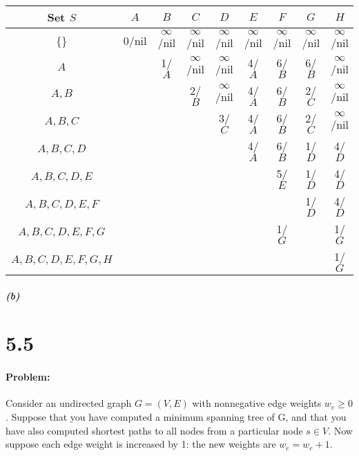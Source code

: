 \documentclass[12pt]{article}
\begin{document}
\begin{center}
\begin{tabular}{ | c | c | c | c | c | c | c | c | c |}
\hline
Set $S$ & $A$ & $B$ & $C$ & $D$ & $E$ & $F$ & $G$ & $H$ \\ \hline
\{\} & 0/nil & $\infty$/nil & $\infty$/nil & $\infty$/nil & $\infty$/nil
& $\infty$/nil & $\infty$/nil & $\infty$/nil \\ \hline
$A$ & & 1/$A$ & $\infty$/nil & $\infty$/nil & 4/$A$ & 6/$B$ & 6/$B$ & $\infty$/nil \\ \hline
$A,B$ & & & 2/$B$ & $\infty$/nil & 4/$A$ & 6/$B$ & 2/$C$ & $\infty$/nil \\ \hline
$A,B,C$ & & & & 3/$C$ & 4/$A$ & 6/$B$ & 2/$C$ & $\infty$/nil \\ \hline
$A,B,C,D$ & & & & & 4/$A$ & 6/$B$ & 1/$D$ & 4/$D$ \\ \hline
$A,B,C,D,E$ & & & & & & 5/$E$ & 1/$D$ & 4/$D$ \\ \hline
$A,B,C,D,E,F$ & & & & & & & 1/$D$ & 4/$D$ \\ \hline
$A,B,C,D,E,F,G$ & & & & & & 1/$G$ & & 1/$G$ \\ \hline
$A,B,C,D,E,F,G,H$ & & & & & & & & 1/$G$ \\ \hline
\end{tabular}
\end{center} 

\subparagraph{(b)}

\begin{center}
\end{center}

\section*{5.5}
\paragraph{Problem:}

Consider an undirected graph $G = (V, E)$ with nonnegative edge weights
$ w_e \ge 0$. Suppose that you have computed a minimum spanning tree of
G, and that you have also computed shortest paths to all nodes from a
particular node $s \in V$.  Now suppose each edge weight is increased by
1: the new weights are $w_e = w_e + 1$.
\end{document}
